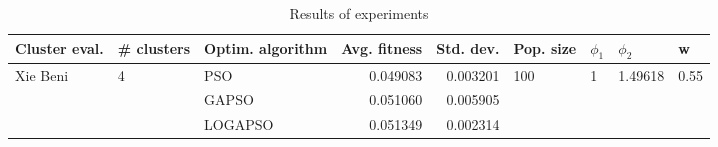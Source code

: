\begin{table}
\centering
\caption{Results of experiments}
\begin{tabular}{lllrrllll}
\toprule
            Cluster eval. &        \# clusters & Optim. algorithm &  Avg. fitness &  Std. dev. &            Pop. size &         $\phi_{1}$ &               $\phi_{2}$ &                     w \\
\midrule
\multirow{3}{*}{Xie Beni} & \multirow{3}{*}{4} &              PSO &      0.049083 &   0.003201 & \multirow{3}{*}{100} & \multirow{3}{*}{1} & \multirow{3}{*}{1.49618} & \multirow{3}{*}{0.55} \\
                          &                    &            GAPSO &      0.051060 &   0.005905 &                      &                    &                          &                       \\
                          &                    &          LOGAPSO &      0.051349 &   0.002314 &                      &                    &                          &                       \\
\bottomrule
\end{tabular}
\end{table}
